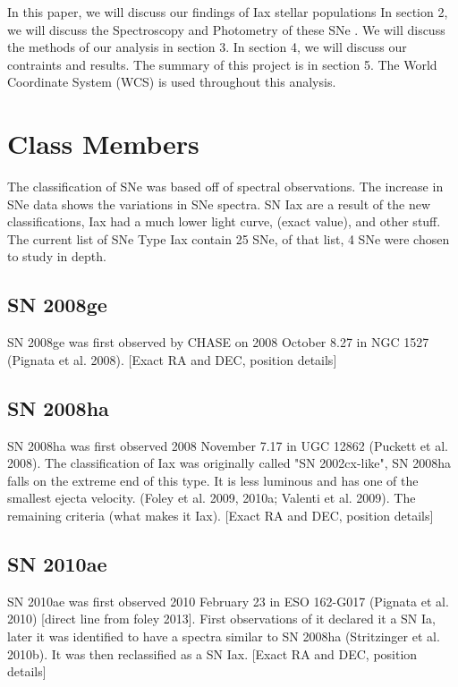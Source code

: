 \documentclass[preprint2]{aastex}
\begin{document}
In this paper, we will discuss our findings of Iax stellar populations
In section 2, we will discuss the Spectroscopy and Photometry of these SNe .
We will discuss the methods of our analysis in section 3. 
In section 4, we will discuss our contraints and results.
The summary of this project is in section 5. 
The World Coordinate System (WCS) is used throughout this analysis. 


\section{Class Members}
The classification of SNe was based off of spectral observations.
The increase in SNe data shows the variations in SNe spectra. 
SN Iax are a result of the new classifications, Iax had a much lower
 light curve, (exact value), and other stuff.  
The current list of SNe Type Iax contain 25 SNe,
of that list, 4 SNe were chosen to study in depth. 

\subsection{SN 2008ge}
SN 2008ge was first observed by CHASE on 2008
October 8.27 in NGC 1527 (Pignata et al. 2008).
[Exact RA and DEC, position details]

\subsection{SN 2008ha}

SN 2008ha was first observed 2008 November 7.17 in UGC 12862 
(Puckett et al. 2008).
The classification of Iax was originally called "SN 2002cx-like",
SN 2008ha falls on the extreme end of this type. 
It is less luminous and has one of the smallest ejecta velocity. 
(Foley et al. 2009, 2010a; Valenti et al. 2009). 
The remaining criteria (what makes it Iax).
[Exact RA and DEC, position details]

\subsection{SN 2010ae}
SN 2010ae was first observed 2010 February 23 in ESO 162-G017
(Pignata et al. 2010) [direct line from foley 2013].
First observations of it declared it a SN Ia, later it was identified to have
a spectra similar to SN 2008ha (Stritzinger et al. 2010b). 
It was then reclassified as a SN Iax.
[Exact RA and DEC, position details]
\end{document}
